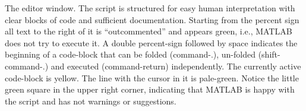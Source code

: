 \label{fig:theEditor} The editor window. The script is structured for easy human interpretation with clear blocks of code and sufficient documentation.
Starting from the percent sign all text to the right of it is ``outcommented'' and appears green, i.e., MATLAB does not try to execute it. A double percent-sign followed by space indicates the beginning of a code-block that can be folded (command-.), un-folded (shift-command-.) and executed (command-return) independently.
The currently active code-block is yellow.
The line with the cursor in it is pale-green. 
Notice the little green square in the upper right corner, indicating that MATLAB is happy with the script and has not warnings or suggestions.